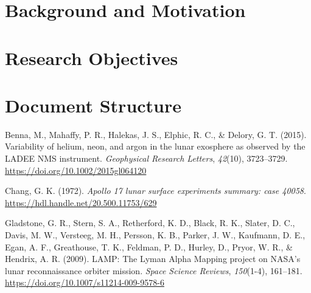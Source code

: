 \documentclass[
  letterpaper,
  DIV=11,
  numbers=noendperiod,
  oneside]{scrartcl}
\newlength{\cslhangindent}
\newlength{\cslentryspacingunit} %
\newenvironment{CSLReferences}[2] %
 {%
  \setlength{\parindent}{0pt}
  \ifodd #1
  \let\oldpar\par
  \def\par{\hangindent=\cslhangindent\oldpar}
  \fi
  \setlength{\parskip}{#2\cslentryspacingunit}
 }%
 {}
\begin{document}
\hypertarget{background-and-motivation}{%
\section{Background and Motivation}\label{background-and-motivation}}

\hypertarget{research-objectives}{%
\section{Research Objectives}\label{research-objectives}}

\hypertarget{document-structure}{%
\section*{Document Structure}\label{document-structure}}

\hypertarget{refs}{}
\begin{CSLReferences}{1}{0}
\leavevmode{}%
Benna, M., Mahaffy, P. R., Halekas, J. S., Elphic, R. C., \& Delory, G.
T. (2015). Variability of helium, neon, and argon in the lunar exosphere
as observed by the {LADEE} {NMS} instrument. \emph{Geophysical Research
Letters}, \emph{42}(10), 3723--3729.
\url{https://doi.org/10.1002/2015gl064120}

\leavevmode{}%
Chang, G. K. (1972). \emph{{Apollo 17 lunar surface experiments summary:
case 40058}}. \url{https://hdl.handle.net/20.500.11753/629}

\leavevmode{}%
Gladstone, G. R., Stern, S. A., Retherford, K. D., Black, R. K., Slater,
D. C., Davis, M. W., Versteeg, M. H., Persson, K. B., Parker, J. W.,
Kaufmann, D. E., Egan, A. F., Greathouse, T. K., Feldman, P. D., Hurley,
D., Pryor, W. R., \& Hendrix, A. R. (2009). {LAMP}: {T}he {L}yman
{A}lpha {M}apping project on {NASA}'s lunar reconnaissance orbiter
mission. \emph{Space Science Reviews}, \emph{150}(1-4), 161--181.
\url{https://doi.org/10.1007/s11214-009-9578-6}

\end{CSLReferences}
\end{document}
